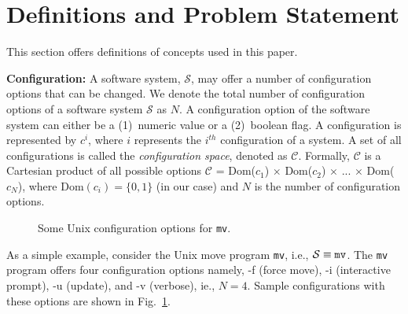 \documentclass[10pt,journal,compsoc]{IEEEtran}
\newcommand{\fig}[1]{Fig.~\ref{fig:#1}}
\begin{document}
\section{Definitions and Problem Statement}
\label{sect:formalization}
\noindent This  section offers definitions of concepts
 used in this paper. 
 
\noindent\textbf{Configuration: }A software system, $\mathcal{S}$, may offer a number of configuration options that can be changed. We denote the total number of configuration options of a software system $\mathcal{S}$  as $N$. A configuration option of the software system can either be a (1)~numeric value or a (2)~boolean flag. A configuration is represented by $c^{i}$, where $i$ represents the $i^{th}$ configuration of a system. A set of all configurations is called the \textit{configuration space}, denoted as $\mathcal{C}$.
  Formally, $\mathcal{C}$ is a Cartesian product of all possible options $\mathcal{C}$ = Dom($c_1$) $\times$ Dom($c_2$) $\times$ ... $\times$ Dom($c_N$), where $\text{Dom}(c_i) = \{0, 1\}$ (in our case) and $N$ is the number of configuration options. 

\begin{figure}
    \scriptsize \centering
    \caption{Some Unix  configuration options for  \texttt{mv}.}
    \label{fig:sample_config}
\end{figure}
As a simple example, consider the Unix move program \texttt{mv}, i.e., $\mathcal{S}\equiv\text{\texttt{mv}}$. The \texttt{mv} program offers four configuration options namely, -f (force move), -i    (interactive prompt), -u (update), and -v (verbose), ie., $N=4$. Sample configurations with these options are shown in \fig{sample_config}. %
\end{document}

